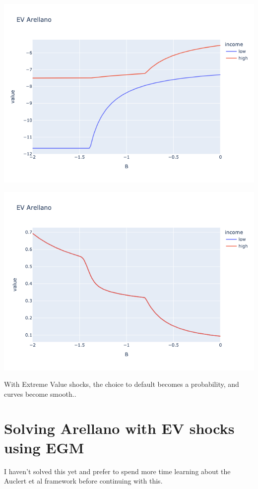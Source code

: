 \includegraphics[scale = 0.75]{figures/EV_arellano.png}

\includegraphics[scale = 0.75]{figures/EV_arellano_laffer.png}

With Extreme Value shocks, the choice to default becomes a probability, and curves become smooth..

\section{Solving Arellano with EV shocks using EGM}

I haven't solved this yet and prefer to spend more time learning about the Auclert et al framework before continuing with this.

